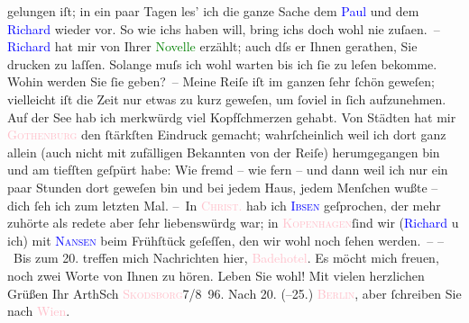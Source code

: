                     gelungen iſt; in ein paar Tagen les’ ich die ganze Sache dem \textcolor{blue}{Paul}{}\ledrightnote{\textcolor{blue}{Paul Goldmann}} und dem \textcolor{blue}{Richard}{}\ledrightnote{\textcolor{blue}{Richard Beer-Hofmann}}
                    wieder vor. So wie ichs haben will, bring ichs doch wohl nie zuſa{\geminationm}en. –\pend
           \pstart
           \textcolor{blue}{Richard}{}\ledrightnote{\textcolor{blue}{Richard Beer-Hofmann}} hat mir von Ihrer \textcolor{green}{Novelle}{} erzählt; auch dſs er Ihnen
                    gerathen, Sie drucken zu laſſen. Solange muſs ich wohl warten bis
                    ich ſie zu leſen bekomme. Wohin werden Sie ſie geben? –\pend
           \pstart
           Meine Reiſe iſt im ganzen ſehr ſchön geweſen; vielleicht iſt die Zeit nur {\pb}etwas zu kurz geweſen, um ſoviel in ſich
                    aufzunehmen.\pend
           \pstart
           Auf der See hab ich merkwürdg viel Kopfſchmerzen gehabt. Von Städten hat mir \textcolor{pink}{\textsc{Gothenburg}}{}\ledrightnote{\textcolor{pink}{Göteborg}} den
                    ſtärkſten Eindruck gemacht; wahrſcheinlich weil ich dort ganz allein (auch nicht
                    mit zufälligen Bekannten von der Reiſe) herumgegangen bin und am tiefſten
                    geſpürt habe: Wie fremd – wie fern – und dann weil ich nur ein paar Stunden dort
                    geweſen bin und bei jedem Haus, jedem Menſchen {\pb}wußte – dich ſeh ich zum letzten Mal.\pend
           \pstart
           – In \textcolor{pink}{\textsc{Christ}.}{}\ledrightnote{\textcolor{pink}{Oslo}} hab ich \textcolor{blue}{\textsc{Ibsen}}{}\ledrightnote{\textcolor{blue}{Henrik Ibsen}} geſprochen, der mehr zuhörte als redete aber ſehr liebenswürdg war; in \textcolor{pink}{\textsc{Kopenhagen}}{}\ledrightnote{\textcolor{pink}{Kopenhagen}}{ }ſind wir (\textcolor{blue}{Richard}{}\ledrightnote{\textcolor{blue}{Richard Beer-Hofmann}} u ich) mit \textcolor{blue}{\textsc{Nansen}}{}\ledrightnote{\textcolor{blue}{Peter Nansen}} beim Frühſtück geſeſſen, den wir wohl noch ſehen werden. –\pend
           \pstart
           – Bis zum 20. treffen mich Nachrichten hier, \textcolor{pink}{Badehotel}{}\ledrightnote{\textcolor{pink}{Badehotel}}. Es möcht mich freuen, noch zwei Worte von Ihnen
                    zu hören.\pend
           \pstart Leben Sie wohl! Mit vielen herzlichen Grüßen Ihr \spacefill\mbox{ArthSch}\pend{}\pstart
           \textcolor{pink}{\textsc{Skodsborg}}{}\ledrightnote{\textcolor{pink}{Skodsborg}}{ }7/8 96. \pend
           \pstart
           Nach 20. (–25.) \textcolor{pink}{\textsc{Berlin}}{}\ledrightnote{\textcolor{pink}{Berlin}}, aber ſchreiben Sie nach \textcolor{pink}{Wien}{}\ledrightnote{\textcolor{pink}{Wien}}.\pend
           \endnumbering{}  
      